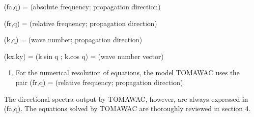    (fa,q) = (absolute frequency; propagation direction)

   (fr,q) = (relative frequency; propagation direction)

   (k,q) = (wave number; propagation direction)

   (kx,ky) = (k.sin q ; k.cos q) = (wave number vector)

 \begin{enumerate}
\item For the numerical resolution of equations, the model TOMAWAC uses the pair (fr,q) = (relative frequency; propagation direction)
\end{enumerate}

 The directional spectra output by TOMAWAC, however, are always expressed in (fa,q). The equations solved by TOMAWAC are thoroughly reviewed in section 4.

